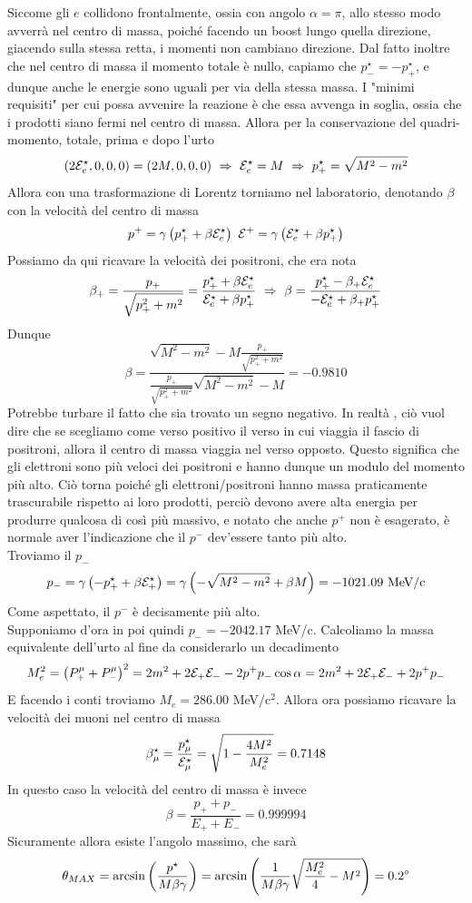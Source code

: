 \documentclass[12pt,twoside,a4]{article}
\begin{document}
\newpage
\begin{solution}
Siccome gli $e$ collidono frontalmente, ossia con angolo $\alpha = \pi$, allo stesso modo avverrà  nel centro di massa, poiché facendo un boost lungo quella direzione, giacendo sulla stessa retta, i momenti non cambiano direzione. Dal fatto inoltre che nel centro di massa il momento totale è nullo, capiamo che $ p^\star_- = - p^\star_+$, e dunque anche le energie sono uguali per via della stessa massa. I "minimi requisiti" per cui possa avvenire la reazione è che essa avvenga in soglia, ossia che i prodotti siano fermi nel centro di massa. Allora per la conservazione del quadri-momento, totale, prima e dopo l'urto
$$ \left({2 \mathcal{E}^\star_e,0,0,0}\right) = \left({2 M,0,0,0}\right)  \  \Rightarrow  \  
\mathcal{E}^\star_e = M  \  \Rightarrow  \  p^\star_+ = \sqrt{M^2 -m^2} $$
Allora con una trasformazione di Lorentz torniamo nel laboratorio, denotando $\beta$ con la velocità  del centro di massa
$$ p^+ = \gamma \left({ p^\star_+ + \beta \mathcal{E}^\star_e}\right)  \  
\mathcal{E}^+ = \gamma \left({ \mathcal{E}^\star_e + \beta p^\star_+  }\right) $$
Possiamo da qui ricavare la velocità  dei positroni, che era nota
$$ \beta_+ = \frac{p_+}{\sqrt{p_+^2 + m^2}} = \frac{ p^\star_+ + \beta \mathcal{E}^\star_e}{ \mathcal{E}^\star_e + \beta p^\star_+  }  \  \Rightarrow  \  
\beta = \frac{ p^\star_+ - \beta_+ \mathcal{E}^\star_e}{ - \mathcal{E}^\star_e + \beta_+ p^\star_+  }$$
Dunque 
$$ \beta = \frac{ \sqrt{M^2 -m^2} - M \frac{p_+}{\sqrt{p_+^2 +m^2}} }{\frac{p_+}{\sqrt{p_+^2 +m^2}} \sqrt{M^2 -m^2} - M } = -0.9810 $$
Potrebbe turbare il fatto che sia trovato un segno negativo. In realtà , ciò vuol dire che se scegliamo come verso positivo il verso in cui viaggia il fascio di positroni, allora il centro di massa viaggia nel verso opposto. Questo significa che gli elettroni sono più veloci dei positroni e hanno dunque un modulo del momento più alto. Ciò torna poiché gli elettroni/positroni hanno massa praticamente trascurabile rispetto ai loro prodotti, perciò devono avere alta energia per produrre qualcosa di così più massivo, e notato che anche $p^+$ non è esagerato, è normale aver l'indicazione che il $p^-$ dev'essere tanto più alto.
\\
Troviamo il $p_-$
$$ p_- = \gamma \left({ - p^\star_+ + \beta \mathcal{E}^\star_+}\right) = \gamma \left({ - \sqrt{M^2- m^2 } + \beta M}\right) =  - 1021.09 \mbox{ MeV/c}$$
Come aspettato, il $p^-$ è decisamente più alto.
\\
Supponiamo d'ora in poi quindi $p_- = - 2042.17 $ MeV/c. Calcoliamo la massa equivalente dell'urto al fine da considerarlo un decadimento
$$ M^2_e = \left({P^\mu_+ + P^\mu_-}\right)^2 = 2m^2 + 2 \mathcal{E}_+ \mathcal{E}_- - 2 p^+ p_- \cos \alpha =  2m^2 + 2 \mathcal{E}_+ \mathcal{E}_- + 2 p^+ p_- $$
E facendo i conti troviamo $M_e = 286.00 $ MeV/c$^2$. Allora ora possiamo ricavare la velocità  dei muoni nel centro di massa
$$ \beta^\star_\mu = \frac{p^\star_\mu}{\mathcal{E}^\star_\mu} = \sqrt{1 - \frac{4M^2}{M^2_e}} = 0.7148$$
In questo caso la velocità  del centro di massa è invece
$$ \beta = \frac{p_+ + p_-}{E_+ + E_-} = 0.999994 $$
Sicuramente allora esiste l'angolo massimo, che sarà 
$$ \theta_{MAX} = \arcsin \left({ \frac{p^\star}{M \beta \gamma}}\right) = \arcsin \left({ \frac{1}{M \beta \gamma} \sqrt{\frac{M^2_e}{4} - M^2}}\right) =  0.2^\circ$$
\end{solution}
\end{document}
